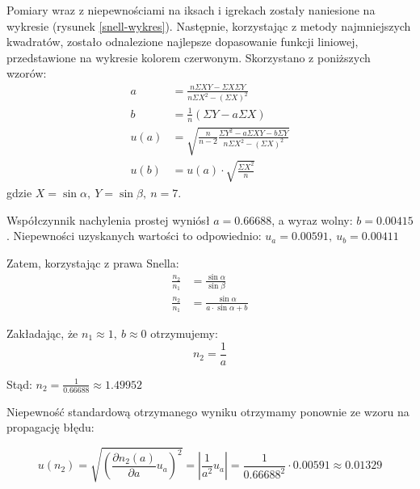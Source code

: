 \documentclass[a4paper]{article}
\newlength{\du}
\begin{document}
Pomiary wraz z niepewnościami na iksach i igrekach zostały naniesione na wykresie (rysunek \ref{snell-wykres}).
Następnie, korzystając z metody najmniejszych kwadratów, zostało odnalezione najlepsze dopasowanie funkcji liniowej, przedstawione na wykresie kolorem czerwonym.
Skorzystano z poniższych wzorów:
\begin{align*}
a &= \frac{n \Sigma X Y - \Sigma X \Sigma Y}{n \Sigma X^2 - \left(\Sigma X\right)^2} \\
b &= \frac{1}{n}\left(\Sigma Y - a \Sigma X\right) \\
u(a) &= \sqrt{\frac{n}{n-2} \frac{\Sigma Y^2 - a\Sigma XY - b\Sigma Y}{n\Sigma X^2-\left(\Sigma X \right)^2}} \\
u(b) &= u(a)\cdot \sqrt{\frac{\Sigma X^2}{n}}
\end{align*}
gdzie $X = \sin\alpha, \ Y = \sin\beta, \ n = 7$.


Współczynnik nachylenia prostej wyniósł $a = 0.66688$, a wyraz wolny: $b = 0.00415$.
Niepewności uzyskanych wartości to odpowiednio:
$ u_a=0.00591, \ u_b=0.00411 $

Zatem, korzystając z prawa Snella:
\begin{align*}
\frac{n_2}{n_1} &= \frac{\sin\alpha}{\sin\beta} \\ 
\frac{n_2}{n_1} &= \frac{\sin\alpha}{a \cdot \sin\alpha + b}
\end{align*}

Zakładając, że $n_1 \approx 1, \ b \approx 0$ otrzymujemy:
\[ n_2 = \frac{1}{a}\]

Stąd: $n_2 = \frac{1}{0.66688} \approx 1.49952$

Niepewność standardową otrzymanego wyniku otrzymamy ponownie ze wzoru na propagację błędu:

\[
		u(n_2) = \sqrt{\left(\frac{\partial n_2(a)}{\partial a}u_{a}\right)^2} = 
		\left| \frac{1}{a^2} u_{a}\right| = \frac{1}{0.66688^2}\cdot 0.00591 \approx 0.01329
\]
\end{document}
